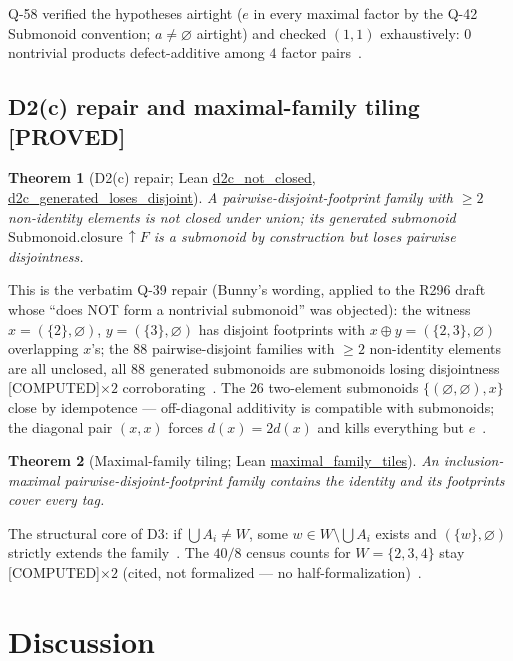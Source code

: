 \documentclass[11pt,a4paper]{article}
\newtheorem{theorem}{Theorem}
\theoremstyle{definition}
\begin{document}
Q-58 verified the hypotheses airtight ($e$ in every maximal factor by
the Q-42 Submonoid convention; $a\ne\varnothing$ airtight) and checked
$(1,1)$ exhaustively: $0$ nontrivial products defect-additive among
$4$ factor pairs~\cite{D322}.

\subsection{D2(c) repair and maximal-family tiling [PROVED]}

\begin{theorem}[D2(c) repair; Lean \url{d2c_not_closed},
  \url{d2c_generated_loses_disjoint}]
  \label{thm:d2c}
  A pairwise-disjoint-footprint family with $\ge2$ non-identity elements
  is not closed under union; its generated submonoid
  $\mathrm{Submonoid.closure}\,\uparrow F$ is a submonoid by
  construction but loses pairwise disjointness.
\end{theorem}

This is the verbatim Q-39 repair (Bunny's wording, applied to the
R296 draft whose ``does NOT form a nontrivial submonoid'' was
objected): the witness $x=(\{2\},\varnothing)$,
$y=(\{3\},\varnothing)$ has disjoint footprints with
$x\oplus y=(\{2,3\},\varnothing)$ overlapping $x$'s; the $88$
pairwise-disjoint families with $\ge2$ non-identity elements are all
unclosed, all $88$ generated submonoids are submonoids losing
disjointness [COMPUTED]$\times2$ corroborating~\cite{D296,D299}.
The $26$ two-element submonoids $\{( \varnothing,\varnothing),x\}$ close
by idempotence — off-diagonal additivity is compatible with
submonoids; the diagonal pair $(x,x)$ forces $d(x)=2d(x)$ and kills
everything but $e$~\cite{D296}.

\begin{theorem}[Maximal-family tiling; Lean \url{maximal_family_tiles}]
  \label{thm:tiles}
  An inclusion-maximal pairwise-disjoint-footprint family contains the
  identity and its footprints cover every tag.
\end{theorem}

The structural core of D3: if $\bigcup A_i\ne W$, some
$w\in W\setminus\bigcup A_i$ exists and $(\{w\},\varnothing)$ strictly
extends the family~\cite{D296}. The $40/8$ census counts for
$W=\{2,3,4\}$ stay [COMPUTED]$\times2$ (cited, not formalized — no
half-formalization)~\cite{D296,D318}.

\section{Discussion}
\label{sec:disc}
\end{document}
